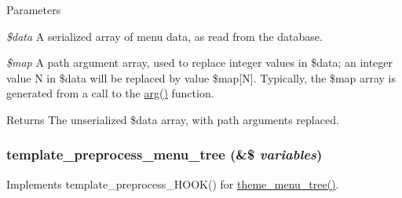 \begin{DoxyParams}{Parameters}
\item[{\em \$data}]A serialized array of menu data, as read from the database. \item[{\em \$map}]A path argument array, used to replace integer values in \$data; an integer value N in \$data will be replaced by value \$map\mbox{[}N\mbox{]}. Typically, the \$map array is generated from a call to the \hyperlink{bootstrap_8inc_afd40bf1dc5dc1f68fb326a8f6e0b88da}{arg()} function.\end{DoxyParams}
\begin{DoxyReturn}{Returns}
The unserialized \$data array, with path arguments replaced. 
\end{DoxyReturn}
\hypertarget{group__menu_ga3b3b2907371200b81f18bfaed7538855}{
\subsubsection[{template\_\-preprocess\_\-menu\_\-tree}]{\setlength{\rightskip}{0pt plus 5cm}template\_\-preprocess\_\-menu\_\-tree (\&\$ {\em variables})}}
\label{group__menu_ga3b3b2907371200b81f18bfaed7538855}
Implements template\_\-preprocess\_\-HOOK() for \hyperlink{group__themeable_ga33100f9d25d899b017bda922086f7358}{theme\_\-menu\_\-tree()}. 